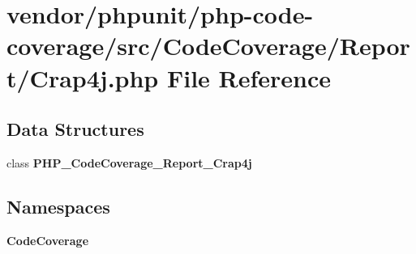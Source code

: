 \section{vendor/phpunit/php-\/code-\/coverage/src/\+Code\+Coverage/\+Report/\+Crap4j.php File Reference}
\label{_crap4j_8php}
\subsection*{Data Structures}
\begin{DoxyCompactItemize}
\item 
class {\bf P\+H\+P\+\_\+\+Code\+Coverage\+\_\+\+Report\+\_\+\+Crap4j}
\end{DoxyCompactItemize}
\subsection*{Namespaces}
\begin{DoxyCompactItemize}
\item 
 {\bf Code\+Coverage}
\end{DoxyCompactItemize}
